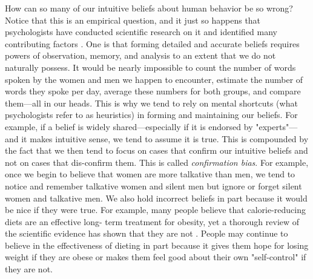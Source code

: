 
How can so many of our intuitive beliefs about human behavior be so wrong? Notice that this is an empirical question, and it just so happens that psychologists have conducted scientific research on it and identified many contributing factors \citep{gilovich_how_2008}. One is that forming detailed and accurate beliefs requires powers of observation, memory, and analysis to an extent that we do not naturally possess. It would be nearly impossible to count the number of words spoken by the women and men we happen to encounter, estimate the number of words they spoke per day, average these numbers for both groups, and compare them---all in our heads. This is why we tend to rely on mental shortcuts (what psychologists refer to as heuristics) in forming and maintaining our beliefs. For example, if a belief is widely shared---especially if it is endorsed by "experts"---and it makes intuitive sense, we tend to assume it is true. This is compounded by the fact that we then tend to focus on cases that confirm our intuitive beliefs and not on cases that dis-confirm them. This is called \emph{confirmation bias}. For example, once we begin to believe that women are more talkative than men, we tend to notice and remember talkative women and silent men but ignore or forget silent women and talkative men. We also hold incorrect beliefs in part because it would be nice if they were true. For example, many people believe that calorie-reducing diets are an effective long- term treatment for obesity, yet a thorough review of the scientific evidence has shown that they are not \citep{mann_medicares_2007}. People may continue to believe in the effectiveness of dieting in part because it gives them hope for losing weight if they are obese or makes them feel good about their own "self-control" if they are not.

